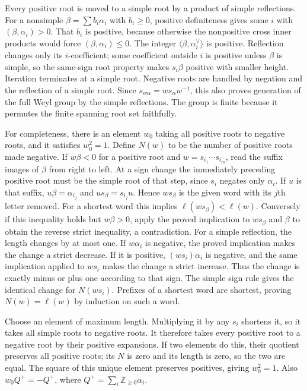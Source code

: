 \documentclass[11pt,a4paper,openany]{report}
\begin{document}
Every positive root is moved to a simple root by a product of simple reflections. For a nonsimple \(\beta=\sum b_i\alpha_i\) with \(b_i\ge0\), positive definiteness gives some \(i\) with \((\beta,\alpha_i)>0\). That \(b_i\) is positive, because otherwise the nonpositive cross inner products would force \((\beta,\alpha_i)\le0\). The integer \(\langle\beta,\alpha_i^\vee\rangle\) is positive. Reflection changes only its \(i\)-coefficient; some coefficient outside \(i\) is positive unless \(\beta\) is simple, so the same-sign root property makes \(s_i\beta\) positive with smaller height. Iteration terminates at a simple root. Negative roots are handled by negation and the reflection of a simple root. Since \(s_{w\alpha}=ws_\alpha w^{-1}\), this also proves generation of the full Weyl group by the simple reflections. The group is finite because it permutes the finite spanning root set faithfully.

For completeness, there is an element \(w_0\) taking all positive roots to negative roots, and it satisfies \(w_0^2=1\). Define \(N(w)\) to be the number of positive roots made negative. If \(w\beta<0\) for a positive root and \(w=s_{i_1}\cdots s_{i_m}\), read the suffix images of \(\beta\) from right to left. At a sign change the immediately preceding positive root must be the simple root of that step, since \(s_i\) negates only \(\alpha_i\). If \(u\) is that suffix, \(u\beta=\alpha_{i_j}\) and \(us_\beta=s_{i_j}u\). Hence \(ws_\beta\) is the given word with its \(j\)th letter removed. For a shortest word this implies \(\ell(ws_\beta)<\ell(w)\). Conversely if this inequality holds but \(w\beta>0\), apply the proved implication to \(ws_\beta\) and \(\beta\) to obtain the reverse strict inequality, a contradiction. For a simple reflection, the length changes by at most one. If \(w\alpha_i\) is negative, the proved implication makes the change a strict decrease. If it is positive, \((ws_i)\alpha_i\) is negative, and the same implication applied to \(ws_i\) makes the change a strict increase. Thus the change is exactly minus or plus one according to that sign. The simple sign rule gives the identical change for \(N(ws_i)\). Prefixes of a shortest word are shortest, proving \(N(w)=\ell(w)\) by induction on such a word.

Choose an element of maximum length. Multiplying it by any \(s_i\) shortens it, so it takes all simple roots to negative roots. It therefore takes every positive root to a negative root by their positive expansions. If two elements do this, their quotient preserves all positive roots; its \(N\) is zero and its length is zero, so the two are equal. The square of this unique element preserves positives, giving \(w_0^2=1\). Also \(w_0Q^+=-Q^+\), where \(Q^+=\sum_i\mathbb Z_{\ge0}\alpha_i\).
\end{document}
